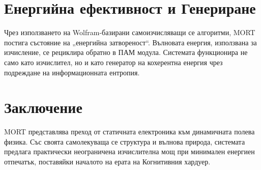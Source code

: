 \documentclass[11pt,a4paper]{article}
\begin{document}
\section{Енергийна ефективност и Генериране}
Чрез използването на Wolfram-базирани самоизчисляващи се алгоритми, MORT постига състояние на „енергийна затвореност“. Вълновата енергия, използвана за изчисление, се рециклира обратно в ПАМ модула. Системата функционира не само като изчислител, но и като генератор на кохерентна енергия чрез подреждане на информационната ентропия.

\section{Заключение}
MORT представлява преход от статичната електроника към динамичната полева физика. Със своята самолекуваща се структура и вълнова природа, системата предлага практически неограничена изчислителна мощ при минимален енергиен отпечатък, поставяйки началото на ерата на Когнитивния хардуер.
\end{document}
